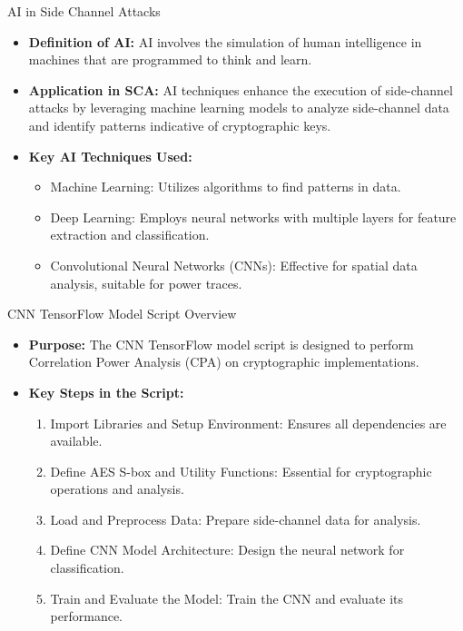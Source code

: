 \documentclass{beamer}
\begin{document}
\begin{frame}{AI in Side Channel Attacks}
    \begin{itemize}
        \item \textbf{Definition of AI:} AI involves the simulation of human intelligence in machines that are programmed to think and learn.
        \item \textbf{Application in SCA:} AI techniques enhance the execution of side-channel attacks by leveraging machine learning models to analyze side-channel data and identify patterns indicative of cryptographic keys.
        \item \textbf{Key AI Techniques Used:}
        \begin{itemize}
            \item Machine Learning: Utilizes algorithms to find patterns in data.
            \item Deep Learning: Employs neural networks with multiple layers for feature extraction and classification.
            \item Convolutional Neural Networks (CNNs): Effective for spatial data analysis, suitable for power traces.
        \end{itemize}
    \end{itemize}
\end{frame}

\begin{frame}{CNN TensorFlow Model Script Overview}
    \begin{itemize}
        \item \textbf{Purpose:} The CNN TensorFlow model script is designed to perform Correlation Power Analysis (CPA) on cryptographic implementations.
        \item \textbf{Key Steps in the Script:}
        \begin{enumerate}
            \item Import Libraries and Setup Environment: Ensures all dependencies are available.
            \item Define AES S-box and Utility Functions: Essential for cryptographic operations and analysis.
            \item Load and Preprocess Data: Prepare side-channel data for analysis.
            \item Define CNN Model Architecture: Design the neural network for classification.
            \item Train and Evaluate the Model: Train the CNN and evaluate its performance.
        \end{enumerate}
    \end{itemize}
\end{frame}
\end{document}
